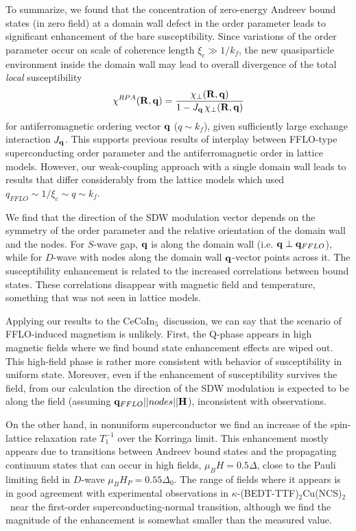 \documentclass[prb,aps,showpacs,amsmath,twocolumn,10pt]{revtex4-1}
\newcommand{\blue}{\textcolor{blue}}
\newcommand{\red}{\textcolor{red}}
\newcommand{\cecoin}{CeCoIn$_5$}
\newcommand{\kbtf}{$\kappa$-(BEDT-TTF)$_2$Cu(NCS)$_2$}
\begin{document}
To summarize, we found that the concentration of zero-energy Andreev bound states (in zero field) at a domain wall 
defect in the order parameter leads to significant enhancement of the bare 
susceptibility. Since variations of the order parameter occur on scale of coherence length $\xi_c \gg 1/k_f$, 
the new quasiparticle environment inside the domain wall may lead to overall divergence of the total 
\emph{local} susceptibility
$$
\chi^{RPA}({\bf R},{\bf q}) = \frac{ \chi_\perp({\bf R},{\bf q})}{1 - J_{\bf q} \, \chi_\perp({\bf R},{\bf q}) }
$$
for antiferromagnetic ordering vector ${\bf q}$ ($q \sim k_f$), given sufficiently 
large exchange interaction $J_{\bf q}$. This supports previous results of interplay between FFLO-type  
superconducting order parameter and the antiferromagnetic order in lattice models.\cite{Yanase2009abs,Marcin2009}
However, our weak-coupling approach with a single domain wall leads to results that differ 
considerably from the lattice models which used $q_{FFLO} \sim 1/\xi_c \sim q \sim k_f$. 

We find that the direction of the SDW modulation vector depends on the symmetry of 
the order parameter and the relative orientation of the domain wall and the nodes. 
For $S$-wave gap, ${\bf q}$ is along the domain wall (i.e. ${\bf q} \perp {\bf q}_{FFLO}$), 
while for $D$-wave with nodes along the domain wall ${\bf q}$-vector points across it. 
The susceptibility enhancement is related to the increased correlations between 
bound states. 
These correlations disappear with magnetic field and temperature, something that was not seen in lattice models. 

Applying our results to the \cecoin\ discussion, we can say that the scenario of FFLO-induced magnetism 
is unlikely. First, the Q-phase appears in high magnetic fields\cite{cecoin5_Kenzelmann, cecoin5_Kenzelmann2} 
where we find bound state enhancement effects are wiped out. 
This high-field phase is rather more consistent with behavior of susceptibility in uniform state.\cite{sc_afm_kato,Rosemeyer2014} 
Moreover, even if the enhancement of susceptibility survives the field, 
from our calculation the direction of the SDW modulation is expected to be along the field 
(assuming ${\bf q}_{FFLO} || nodes || {\bf H}$), inconsistent with observations.\cite{Gerber2014}

On the other hand, in nonuniform superconductor we find an increase of the spin-lattice relaxation rate $T_1^{-1}$ 
over the Korringa limit. This enhancement mostly appears due to transitions 
between Andreev bound states and the propagating continuum states that can occur in high fields, 
$\mu_B H = 0.5 \Delta$, close to the Pauli limiting field in $D$-wave $\mu_B H_P = 0.55 \Delta_0$. The range of fields where it appears is in good agreement with experimental observations in \kbtf\ near the first-order superconducting-normal transition,\cite{Mayaffre2014} although we find the magnitude of the enhancement is somewhat smaller than the measured value.
\end{document}
